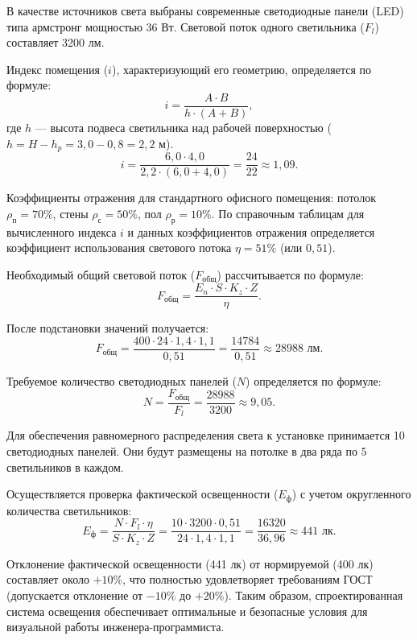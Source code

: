 В качестве источников света выбраны современные светодиодные панели (LED) типа армстронг мощностью 36 Вт. Световой поток одного светильника ($F_l$) составляет 3200 лм.

Индекс помещения ($i$), характеризующий его геометрию, определяется по формуле:
\begin{equation}
    i = \frac{A \cdot B}{h \cdot (A + B)},
\end{equation}
где $h$ --- высота подвеса светильника над рабочей поверхностью ($h = H - h_p = 3,0 - 0,8 = 2,2$ м).
\begin{equation}
    i = \frac{6,0 \cdot 4,0}{2,2 \cdot (6,0 + 4,0)} = \frac{24}{22} \approx 1,09.
\end{equation}

Коэффициенты отражения для стандартного офисного помещения: потолок $\rho_{п} = 70\%$, стены $\rho_{с} = 50\%$, пол $\rho_{р} = 10\%$. По справочным таблицам для вычисленного индекса $i$ и данных коэффициентов отражения определяется коэффициент использования светового потока $\eta = 51\%$ (или $0,51$).

Необходимый общий световой поток ($F_{общ}$) рассчитывается по формуле:
\begin{equation}
    F_{общ} = \frac{E_n \cdot S \cdot K_z \cdot Z}{\eta}.
\end{equation}

После подстановки значений получается:
\begin{equation}
    F_{общ} = \frac{400 \cdot 24 \cdot 1,4 \cdot 1,1}{0,51} = \frac{14784}{0,51} \approx 28988 \text{ лм}.
\end{equation}

Требуемое количество светодиодных панелей ($N$) определяется по формуле:
\begin{equation}
    N = \frac{F_{общ}}{F_l} = \frac{28988}{3200} \approx 9,05.
\end{equation}

Для обеспечения равномерного распределения света к установке принимается 10 светодиодных панелей. Они будут размещены на потолке в два ряда по 5 светильников в каждом.

Осуществляется проверка фактической освещенности ($E_{ф}$) с учетом округленного количества светильников:
\begin{equation}
    E_{ф} = \frac{N \cdot F_l \cdot \eta}{S \cdot K_z \cdot Z} = \frac{10 \cdot 3200 \cdot 0,51}{24 \cdot 1,4 \cdot 1,1} = \frac{16320}{36,96} \approx 441 \text{ лк}.
\end{equation}

Отклонение фактической освещенности (441 лк) от нормируемой (400 лк) составляет около $+10\%$, что полностью удовлетворяет требованиям ГОСТ (допускается отклонение от $-10\%$ до $+20\%$). Таким образом, спроектированная система освещения обеспечивает оптимальные и безопасные условия для визуальной работы инженера-программиста.